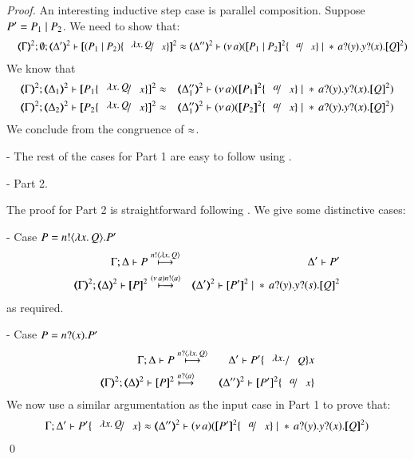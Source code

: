 \begin{proof}
	\noi An interesting inductive step case is parallel composition. Suppose $P' = P_1 \;|\; P_2$. We need to show that:
%
	\begin{eqnarray*}
		&& \tmap{\Gamma}{2}; \es; \tmap{\Delta'}{2} \proves \pmap{(P_1 \Par P_2) \subst{\abs{x}{Q}}{x}}{2} \wb
		\tmap{\Delta''}{2} \proves \newsp{a}{\pmap{P_1 \Par P_2}{2} \subst{a}{x} \Par \repl{} \binp{a}{y} \binp{y}{x} \pmap{Q}{2}}
	\end{eqnarray*}
%
	\noi We know that
%
	\begin{eqnarray*}
		\horel{\tmap{\Gamma}{2}}{\tmap{\Delta_1}{2}}{\pmap{P_1\subst{\abs{x}{Q}}{x}}{2}}{&\wb&}
		{\tmap{\Delta_1''}{2}}{\newsp{a}{\pmap{P_1}{2} \subst{a}{x} \Par \repl{} \binp{a}{y} \binp{y}{x} \pmap{Q}{2}}}\\
		\horel{\tmap{\Gamma}{2}}{\tmap{\Delta_2}{2}}{\pmap{P_2\subst{\abs{x}{Q}}{x}}{2}}{&\wb&}
		{\tmap{\Delta_1''}{2}}{\newsp{a}{\pmap{P_2}{2} \subst{a}{x} \Par \repl{} \binp{a}{y} \binp{y}{x} \pmap{Q}{2}}}
	\end{eqnarray*}
%
	\noi We conclude from the congruence of $\approx$.

	\noi - The rest of the cases for Part 1 are easy to follow using .

	\noi - Part 2.

	\noi The proof for Part 2 is straightforward following .
	We give some distinctive cases:

	\noi - Case $P = n ! \langle \lambda x.\,Q \rangle . P'$
%
	\begin{eqnarray*}
		\horel{\Gamma}{\Delta}{P}{&\hby{\bactout{n}{\abs{x}{Q}}}&}{\Delta'}{P'}\\
		\horel{\tmap{\Gamma}{2}}{\tmap{\Delta}{2}}{\pmap{P}{2}}{& \hby{\news{a} \bactout{n}{a}}&}{\tmap{\Delta'}{2}}{\pmap{P'}{2} \Par \repl{} \binp{a}{y} \binp{y}{s} \pmap{Q}{2}}
	\end{eqnarray*}
%
	\noi as required.

	\noi - Case $P = n ? (x) . P'$
%
	\begin{eqnarray*}
		\horel{\Gamma}{\Delta}{P}{&\hby{\bactinp{n}{\abs{x}{Q}}}&}{\Delta'}{P' \subst{\abs{x}}{Q}}{x}\\
		\horel{\tmap{\Gamma}{2}}{\tmap{\Delta}{2}}{\pmap{P}{2}}{& \hby{\bactinp{n}{a}}&}{\tmap{\Delta''}{2}}{\pmap{P'}{2} \subst{a}{x}}
	\end{eqnarray*}
%
	\noi We now use a similar argumentation as the input case in Part 1 to prove that:
%
	\begin{eqnarray*}
		\horel{\Gamma}{\Delta'}{P' \subst{\abs{x}{Q}}{x}}
		{\wb}
		{\tmap{\Delta''}{2}}{\newsp{a}{\pmap{P'}{2} \subst{a}{x} \Par \repl{} \binp{a}{y} \binp{y}{x} \pmap{Q}{2}}}
	\end{eqnarray*}
%
	\qed
\end{proof}

